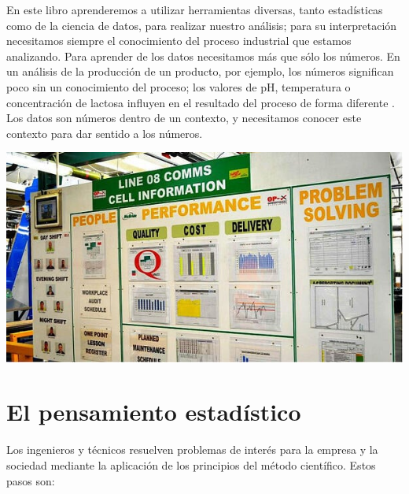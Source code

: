 \documentclass[
  letterpaper,
]{scrbook}
\begin{document}
En este libro aprenderemos a utilizar herramientas diversas, tanto
estadísticas como de la ciencia de datos, para realizar nuestro
análisis; para su interpretación necesitamos siempre el conocimiento del
proceso industrial que estamos analizando. Para aprender de los datos
necesitamos más que sólo los números. En un análisis de la producción de
un producto, por ejemplo, los números significan poco sin un
conocimiento del proceso; los valores de pH, temperatura o concentración
de lactosa influyen en el resultado del proceso de forma diferente . Los
datos son números dentro de un contexto, y necesitamos conocer este
contexto para dar sentido a los números.

\begin{marginfigure}

{\centering \includegraphics{./01-imagenes/Lean Visual Management Boards in Factories Keep It Simple.jpg}

}

\end{marginfigure}

\hypertarget{el-pensamiento-estaduxedstico}{%
\section{El pensamiento
estadístico}\label{el-pensamiento-estaduxedstico}}

Los ingenieros y técnicos resuelven problemas de interés para la empresa
y la sociedad mediante la aplicación de los principios del método
científico. Estos pasos son:
\end{document}
